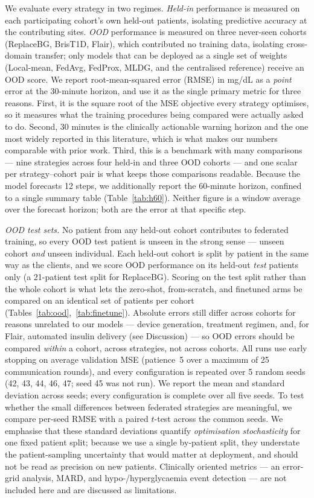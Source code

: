 \documentclass[10pt,letterpaper]{article}
\begin{document}
We evaluate every strategy in two regimes. \emph{Held-in} performance is measured
on each participating cohort's own held-out patients, isolating predictive
accuracy at the contributing sites. \emph{OOD} performance is measured on three
never-seen cohorts (ReplaceBG, BrisT1D, Flair), which contributed no training
data, isolating cross-domain transfer; only models that can be deployed as a
single set of weights (Local-mean, FedAvg, FedProx, MLDG, and the centralised
reference) receive an OOD score.
We report root-mean-squared error (RMSE) in mg/dL as a \emph{point} error at the
30-minute horizon, and use it as the single primary metric for three reasons.
First, it is the square root of the MSE objective every strategy optimises, so it
measures what the training procedures being compared were actually asked to do.
Second, 30 minutes is the clinically actionable warning horizon and the one most
widely reported in this literature, which is what makes our numbers comparable
with prior work. Third, this is a benchmark with many comparisons --- nine
strategies across four held-in and three OOD cohorts --- and one scalar per
strategy--cohort pair is what keeps those comparisons readable. Because the model
forecasts 12 steps, we additionally report the 60-minute horizon, confined to a
single summary table (Table~\ref{tab:h60}). Neither figure is a window average
over the forecast horizon; both are the error at that specific step.

\emph{OOD test sets.} No patient from any held-out cohort contributes to federated
training, so every OOD test patient is unseen in the strong sense --- unseen
cohort \emph{and} unseen individual. Each held-out cohort is split by patient in
the same way as the clients, and we score OOD performance on its held-out
\emph{test} patients only (a 21-patient test split for ReplaceBG). Scoring on the
test split rather than the whole cohort is what lets the zero-shot, from-scratch,
and finetuned arms be compared on an identical set of patients per cohort
(Tables~\ref{tab:ood},~\ref{tab:finetune}). Absolute errors still differ across
cohorts for reasons unrelated to our models --- device generation, treatment
regimen, and, for Flair, automated insulin delivery (see Discussion) --- so OOD
errors should be compared \emph{within} a cohort, across strategies, not across
cohorts. All runs use early stopping on average validation MSE (patience~5 over a
maximum of 25 communication rounds), and every configuration is repeated over 5
random seeds (42, 43, 44, 46, 47; seed 45 was not run). We report the mean and
standard deviation across seeds; every configuration is complete over all five
seeds. To test whether the small differences between federated
strategies are meaningful, we compare per-seed RMSE with a paired $t$-test across
the common seeds. We emphasise that these standard deviations quantify
\emph{optimisation stochasticity} for one fixed patient split; because we use a
single by-patient split, they understate the patient-sampling uncertainty that
would matter at deployment, and should not be read as precision on new patients.
Clinically oriented metrics --- an error-grid analysis, MARD, and
hypo-/hyperglycaemia event detection --- are not included here and are discussed
as limitations.
\end{document}
